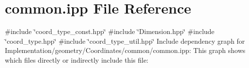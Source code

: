 \hypertarget{Implementation_2geometry_2Coordinates_2common_2common_8ipp}{}\section{common.\+ipp File Reference}
\label{Implementation_2geometry_2Coordinates_2common_2common_8ipp}
{\ttfamily \#include \char`\"{}coord\+\_\+type\+\_\+const.\+hpp\char`\"{}}\newline
{\ttfamily \#include \char`\"{}Dimension.\+hpp\char`\"{}}\newline
{\ttfamily \#include \char`\"{}coord\+\_\+type.\+hpp\char`\"{}}\newline
{\ttfamily \#include \char`\"{}coord\+\_\+type\+\_\+util.\+hpp\char`\"{}}\newline
Include dependency graph for Implementation/geometry/\+Coordinates/common/common.ipp\+:
This graph shows which files directly or indirectly include this file\+:
